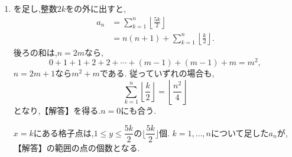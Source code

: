 \noindent {}\par\nobreak
\begin{enumerate}[label=(\arabic*),parsep=3pt,beginpenalty=10000,format=\bookitemlink{example-gauss-role-10}{solution}{problem}]
  \item {}を足し,整数$2k$をの外に出すと,
    \begin{align*}
      a_n&=\sum_{k=1}^{n}\left\lfloor\frac{5k}{2}\right\rfloor\\
      &=n(n+1)+\sum_{k=1}^{n}\left\lfloor\frac k2\right\rfloor.
    \end{align*}
    後ろの和は,$n=2m$なら,
    \[
      0+1+1+2+2+\cdots+(m-1)+(m-1)+m=m^2,
    \]
    $n=2m+1$なら$m^2+m$である.
    従っていずれの場合も,
    \[
      \sum_{k=1}^{n}\left\lfloor\frac k2\right\rfloor
      =\left\lfloor\frac{n^2}{4}\right\rfloor
    \]
    となり,【解答】を得る.$n=0$にも合う.

    $x=k$にある格子点は,$1\le y\le\dfrac{5k}{2}$の$\lfloor\dfrac{5k}{2}\rfloor$個.
    $k=1,\ldots,n$について足した$a_n$が,【解答】の範囲の点の個数となる.
\end{enumerate}
